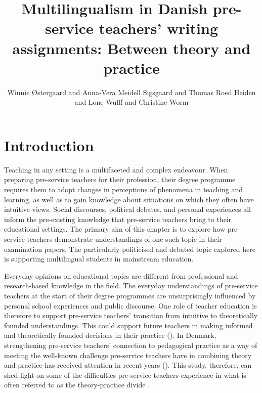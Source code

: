 \documentclass[output=paper]{langscibook}
\author{Winnie Østergaard\orcid{}\affiliation{VIA University College} and Anna-Vera Meidell Sigsgaard\orcid{}\affiliation{University College of Copenhagen} and Thomas Roed Heiden\orcid{}\affiliation{UCL University College ; University of Aarhus} and Lone Wulff\orcid{}\affiliation{University College of Copenhagen} and Christine Worm\orcid{}\affiliation{University College of Northern Denmark}}
\title[Multilingualism in Danish pre-service teachers’ writing assignments]{Multilingualism in Danish pre-service teachers’ writing assignments: Between theory and practice}
\begin{document}
\maketitle 
{}
\label{chap:5}
\newpage

\section{Introduction}

Teaching in any setting is a multifaceted and complex endeavour. When preparing pre-service teachers for their profession, their degree programme requires them to adopt changes in perceptions of phenomena in teaching and learning, as well as to gain knowledge about situations on which they often have intuitive views. Social discourses, political debates, and personal experiences all inform the pre-existing knowledge that pre-service teachers bring to their educational settings. The primary aim of this chapter is to explore how pre-service teachers demonstrate understandings of one such topic in their examination papers. The particularly politicised and debated topic explored here is supporting multilingual students in mainstream education.

Everyday opinions on educational topics are different from professional and research-based knowledge in the field. The everyday understandings of pre-service teachers at the start of their degree programmes are unsurprisingly influenced by personal school experiences and public discourse. One role of teacher education is therefore to support pre-service teachers’ transition from intuitive to theoretically founded understandings. This could support future teachers in making informed and theoretically founded decisions in their practice (\citealt{Rusznyak2021,TilakaratnaSzenes2021}). In Denmark, strengthening pre-service teachers’ connection to pedagogical practice \citep{Rasmussen2022} as a way of meeting the well-known challenge pre-service teachers have in combining theory and practice  has received attention in recent years (\citealt{Cochran-SmithZeichner2005}). This study, therefore, can shed light on some of the difficulties pre-service teachers experience in what is often referred to as the theory-practice divide \citep{Gravett2012}.
\end{document}
